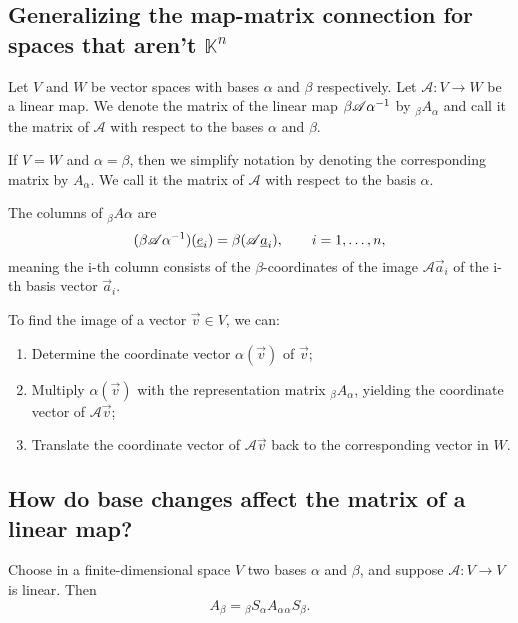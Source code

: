 \subsection{Generalizing the map-matrix connection for spaces that aren't \texorpdfstring{$\mathbb{K}^n$}{K}}

\begin{definition}
    Let $V$ and $W$ be vector spaces with bases $\alpha$ and $\beta$ respectively. Let $\mathscr{A}: V \to W$ be a linear map.
    We denote the matrix of the linear map $\beta\mathscr{A}\alpha^{-1}$ by $_\beta A _\alpha$ and call it the matrix
    of $\mathscr{A}$ with respect to the bases $\alpha$ and $\beta$.
\end{definition}

\begin{remark}
    If $V = W$ and $\alpha = \beta$, then we simplify notation by denoting the corresponding matrix by $A_\alpha$.
    We call it the matrix of $\mathscr{A}$ with respect to the basis $\alpha$.
\end{remark}

\begin{remark}
    The columns of $_\beta A \alpha$ are
    $$(\beta\mathscr{A}\alpha^{-1})(\underline{e}_i) = \beta(\mathscr{A}\underline{a}_i), \qquad i = 1,\dots,n,$$
    meaning the i-th column consists of the $\beta$-coordinates of the image $\mathscr{A}\vec{a}_i$ of the i-th basis vector $\vec{a}_i$.
\end{remark}

\begin{remark}
    To find the image of a vector $\vec{v} \in V$, we can:
    \begin{enumerate}
        \item Determine the coordinate vector $\alpha(\vec{v})$ of $\vec{v}$;
        \item Multiply $\alpha(\vec{v})$ with the representation matrix $_\beta A _\alpha$, yielding the coordinate vector
            of $\mathscr{A}\vec{v}$;
        \item Translate the coordinate vector of $\mathscr{A}\vec{v}$ back to the corresponding vector in $W$.
    \end{enumerate}
\end{remark}

\subsection{How do base changes affect the matrix of a linear map?}

\begin{theorem}
    Choose in a finite-dimensional space $V$ two bases $\alpha$ and $\beta$, and suppose $\mathscr{A}: V \to V$ is linear. Then
    $$A_\beta = {_\beta S _\alpha} {A_\alpha} {_\alpha S _\beta}.$$
\end{theorem}

